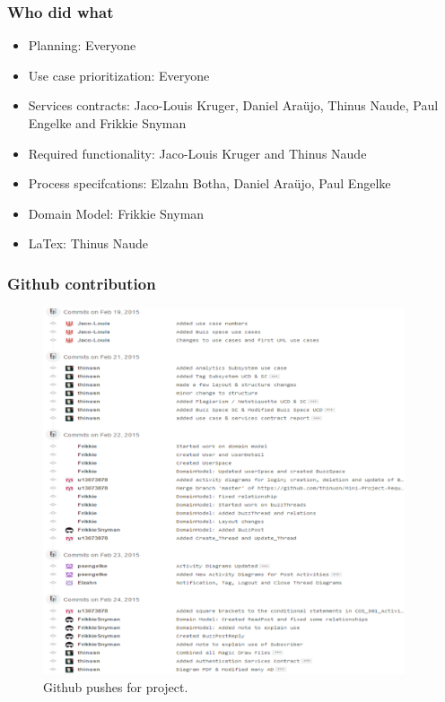 \documentclass [a4paper,12pt] {article}
\begin{document}
		\subsubsection{Who did what}
			\begin{itemize}
				\item Planning: Everyone
				\item Use case prioritization: Everyone
				\item Services contracts: Jaco-Louis Kruger, Daniel Araüjo, Thinus Naude, Paul Engelke and Frikkie Snyman
				\item Required functionality: Jaco-Louis Kruger and Thinus Naude
				\item Process specifcations: Elzahn Botha, Daniel Araüjo, Paul Engelke
				\item Domain Model: Frikkie Snyman
				\item LaTex: Thinus Naude
			\end{itemize}
		\pagebreak
		\subsubsection{Github contribution}
		\begin{figure}[!htbp]
			\centering
			\includegraphics[width=0.95\textwidth]{githubCommits.png}
			\caption{Github pushes for project.}
		\end{figure}
\pagebreak
\end{document}

